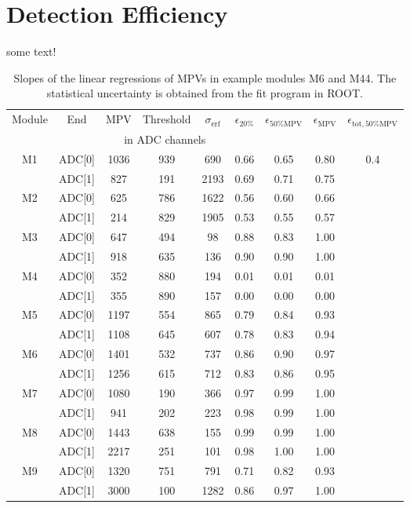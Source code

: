 \section{Detection Efficiency}
some text!
\small
\begin{longtable}{c c c c c c c c c}
  \caption{Slopes of the linear regressions of MPVs in example modules M6 and M44. The statistical uncertainty is obtained from the fit program in ROOT. } \\
  \toprule
  Module & End & MPV & Threshold & $\sigma{}_{\mathrm{erf}}$ & $\epsilon_{20\%}$ & $\epsilon_{50\%\mathrm{MPV}}$ & $\epsilon_{\mathrm{MPV}}$ & $\epsilon_{\mathrm{tot}, 50\%\mathrm{MPV}}$ \\
         &     & \multicolumn{3}{|c|}{in ADC channels} &   \\
  \midrule
  \endfirsthead
  M1 & ADC[0] & 1036 & 939 & 690 & 0.66 & 0.65 & 0.80 & \multirow{2}{*}{0.4}\\
     & ADC[1] & 827 & 191 & 2193 & 0.69 & 0.71 & 0.75 & \\
  M2 & ADC[0] & 625 & 786 & 1622 & 0.56 & 0.60 & 0.66\\
     & ADC[1] & 214 & 829 & 1905 & 0.53 & 0.55 & 0.57\\
  M3 & ADC[0] & 647 & 494 & 98 & 0.88 & 0.83 & 1.00\\
     & ADC[1] & 918 & 635 & 136 & 0.90 & 0.90 & 1.00\\
  M4 & ADC[0] & 352 & 880 & 194 & 0.01 & 0.01 & 0.01\\
     & ADC[1] & 355 & 890 & 157 & 0.00 & 0.00 & 0.00\\
  M5 & ADC[0] & 1197 & 554 & 865 & 0.79 & 0.84 & 0.93\\
     & ADC[1] & 1108 & 645 & 607 & 0.78 & 0.83 & 0.94\\
  \midrule
  M6 & ADC[0] & 1401 & 532 & 737 & 0.86 & 0.90 & 0.97\\
     & ADC[1] & 1256 & 615 & 712 & 0.83 & 0.86 & 0.95\\
  M7 & ADC[0] & 1080 & 190 & 366 & 0.97 & 0.99 & 1.00\\
     & ADC[1] & 941 & 202 & 223 & 0.98 & 0.99 & 1.00\\
  M8 & ADC[0] & 1443 & 638 & 155 & 0.99 & 0.99 & 1.00\\
     & ADC[1] & 2217 & 251 & 101 & 0.98 & 1.00 & 1.00\\
  M9 & ADC[0] & 1320 & 751 & 791 & 0.71 & 0.82 & 0.93\\
     & ADC[1] & 3000 & 100 & 1282 & 0.86 & 0.97 & 1.00\\

\end{longtable}
